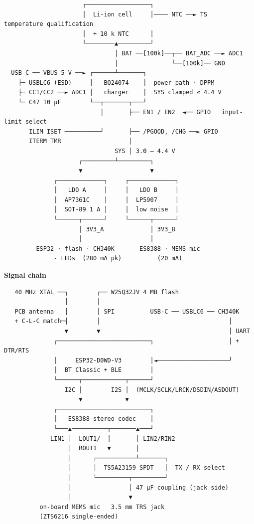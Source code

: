 \documentclass[11pt]{article}
\begin{document}
\begin{Verbatim}
                      ┌──────────────────┐
                      │  Li-ion cell     │──── NTC ──► TS   temperature qualification
                      │  + 10 k NTC      │
                      └────────▲─────────┘
                               │ BAT ──[100k]──┬── BAT_ADC ──► ADC1
                               │               └──[100k]── GND
  USB-C ── VBUS 5 V ──► ┌──────┴───────┐
    ├─ USBLC6 (ESD)     │   BQ24074    │  power path · DPPM
    ├─ CC1/CC2 ──► ADC1 │   charger    │  SYS clamped ≤ 4.4 V
    └─ C47 10 µF        └──┬───────┬───┘
                           │       ├── EN1 / EN2  ◄── GPIO   input-limit select
       ILIM ISET ──────────┘       ├── /PGOOD, /CHG ──► GPIO
       ITERM TMR                   │
                               SYS │ 3.0 – 4.4 V
                     ┌─────────┴─────────┐
                     ▼                   ▼
              ┌─────────────┐     ┌─────────────┐
              │   LDO A     │     │   LDO B     │
              │  AP7361C    │     │  LP5907     │
              │  SOT-89 1 A │     │  low noise  │
              └──────┬──────┘     └──────┬──────┘
                     │ 3V3_A             │ 3V3_B
                     │                   │
         ESP32 · flash · CH340K       ES8388 · MEMS mic
              · LEDs  (280 mA pk)          (20 mA)
\end{Verbatim}

\textbf{Signal chain}

\begin{Verbatim}
   40 MHz XTAL ──┐        ┌── W25Q32JV 4 MB flash
                 │        │
   PCB antenna   │        │ SPI          USB-C ── USBLC6 ── CH340K
   + C-L-C match─┤        │                                    │
                 ▼        ▼                                    │ UART
              ┌──────────────────────────┐                     │ + DTR/RTS
              │     ESP32-D0WD-V3        │◄────────────────────┘
              │  BT Classic + BLE        │
              └──────┬────────────┬──────┘
                 I2C │        I2S │  (MCLK/SCLK/LRCK/DSDIN/ASDOUT)
                     ▼            ▼
              ┌──────────────────────────┐
              │   ES8388 stereo codec    │
              └───▲──────────┬───────▲───┘
             LIN1 │  LOUT1/  │       │ LIN2/RIN2
                  │  ROUT1   ▼       │
                  │      ┌───────────┴───────┐
                  │      │  TS5A23159 SPDT   │  TX / RX select
                  │      └─────────┬─────────┘
                  │                │ 47 µF coupling (jack side)
                  │                ▼
          on-board MEMS mic   3.5 mm TRS jack
          (ZTS6216 single-ended)
\end{Verbatim}
\end{document}
